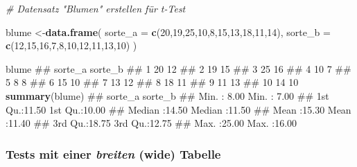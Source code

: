\documentclass[]{book}
\newenvironment{Shaded}{\begin{snugshade}}{\end{snugshade}}
\newcommand{\KeywordTok}[1]{\textcolor[rgb]{0.13,0.29,0.53}{\textbf{#1}}}
\newcommand{\DataTypeTok}[1]{\textcolor[rgb]{0.13,0.29,0.53}{#1}}
\newcommand{\DecValTok}[1]{\textcolor[rgb]{0.00,0.00,0.81}{#1}}
\newcommand{\CommentTok}[1]{\textcolor[rgb]{0.56,0.35,0.01}{\textit{#1}}}
\newcommand{\OperatorTok}[1]{\textcolor[rgb]{0.81,0.36,0.00}{\textbf{#1}}}
\newcommand{\NormalTok}[1]{#1}
\begin{document}
\begin{Shaded}
\begin{Highlighting}[]

\CommentTok{# Datensatz "Blumen" erstellen für t-Test}

\NormalTok{blume <-}\KeywordTok{data.frame}\NormalTok{(}
  \DataTypeTok{sorte_a =} \KeywordTok{c}\NormalTok{(}\DecValTok{20}\NormalTok{,}\DecValTok{19}\NormalTok{,}\DecValTok{25}\NormalTok{,}\DecValTok{10}\NormalTok{,}\DecValTok{8}\NormalTok{,}\DecValTok{15}\NormalTok{,}\DecValTok{13}\NormalTok{,}\DecValTok{18}\NormalTok{,}\DecValTok{11}\NormalTok{,}\DecValTok{14}\NormalTok{),}
  \DataTypeTok{sorte_b =} \KeywordTok{c}\NormalTok{(}\DecValTok{12}\NormalTok{,}\DecValTok{15}\NormalTok{,}\DecValTok{16}\NormalTok{,}\DecValTok{7}\NormalTok{,}\DecValTok{8}\NormalTok{,}\DecValTok{10}\NormalTok{,}\DecValTok{12}\NormalTok{,}\DecValTok{11}\NormalTok{,}\DecValTok{13}\NormalTok{,}\DecValTok{10}\NormalTok{)}
\NormalTok{  )}

\NormalTok{blume}
\NormalTok{##    sorte_a sorte_b}
\NormalTok{## 1       20      12}
\NormalTok{## 2       19      15}
\NormalTok{## 3       25      16}
\NormalTok{## 4       10       7}
\NormalTok{## 5        8       8}
\NormalTok{## 6       15      10}
\NormalTok{## 7       13      12}
\NormalTok{## 8       18      11}
\NormalTok{## 9       11      13}
\NormalTok{## 10      14      10}
\KeywordTok{summary}\NormalTok{(blume)}
\NormalTok{##     sorte_a         sorte_b     }
\NormalTok{##  Min.   : 8.00   Min.   : 7.00  }
\NormalTok{##  1st Qu.:11.50   1st Qu.:10.00  }
\NormalTok{##  Median :14.50   Median :11.50  }
\NormalTok{##  Mean   :15.30   Mean   :11.40  }
\NormalTok{##  3rd Qu.:18.75   3rd Qu.:12.75  }
\NormalTok{##  Max.   :25.00   Max.   :16.00}
\end{Highlighting}
\end{Shaded}

\subsubsection{\texorpdfstring{Tests mit einer \emph{breiten} (wide)
Tabelle}{Tests mit einer breiten (wide) Tabelle}}\label{tests-mit-einer-breiten-wide-tabelle}

\begin{Shaded}
\end{Shaded}
\end{document}
